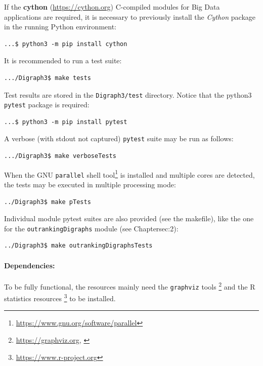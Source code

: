If the \textbf{cython} (\href{https://cython.org}{https://cython.org}) C-compiled modules for Big Data applications are required, it is necessary to previously install the \emph{Cython} package in the running Python environment:
\begin{footnotesize}
\begin{verbatim}
...$ python3 -m pip install cython
\end{verbatim}
\end{footnotesize}
It is recommended to run a test suite:
\begin{footnotesize}
\begin{verbatim}
.../Digraph3$ make tests
\end{verbatim}
\end{footnotesize}
Test results are stored in the \texttt{Digraph3/test} directory. Notice that the python3 \texttt{pytest} package is required:
\begin{footnotesize}
\begin{verbatim}
...$ python3 -m pip install pytest
\end{verbatim}
\end{footnotesize}
A verbose (with stdout not captured) \texttt{pytest} suite may be run as follows:
\begin{footnotesize}
\begin{verbatim}
.../Digraph3$ make verboseTests
\end{verbatim}
\end{footnotesize}
When the GNU \texttt{parallel} shell tool\footnote{\href{https://www.gnu.org/software/parallel}{https://www.gnu.org/software/parallel}} is installed and multiple cores are detected, the tests may be executed in multiple processing mode:
\begin{footnotesize}
\begin{verbatim}
../Digraph3$ make pTests 
\end{verbatim}
\end{footnotesize}
Individual module pytest suites are also provided (see the makefile), like the one for the \texttt{outrankingDigraphs} module (see Chapter{sec:2}):
\begin{footnotesize}
\begin{verbatim}
../Digraph3$ make outrankingDigraphsTests
\end{verbatim}
\end{footnotesize}

\paragraph{Dependencies:}
To be fully functional, the \Digraph resources mainly need the \texttt{graphviz} tools \footnote{\href{https://graphviz.org}{https://graphviz.org}, \citet{graphViz}} and the R statistics resources \footnote{\href{https://www.r-project.org}{https://www.r-project.org}} to be installed.

